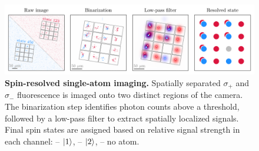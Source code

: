 
\begin{figure}
    \centering
    \includegraphics{fig-py/imaging-spin-resolved.pdf}
    \caption{
        \textbf{Spin-resolved single-atom imaging.}
        Spatially separated $\sigma_+$ and $\sigma_-$ fluorescence is imaged onto two distinct regions of the camera. The binarization step identifies photon counts above a threshold, followed by a low-pass filter to extract spatially localized signals. Final spin states are assigned based on relative signal strength in each channel:
        \raisebox{-1pt}{\scalebox{1.5}{\textcolor{ublue}{\textbullet}}} -- $\left| 1 \right\rangle$, 
        \raisebox{-1pt}{\scalebox{1.5}{\textcolor{ured}{\textbullet}}} -- $\left| 2 \right\rangle$, 
        \raisebox{-1pt}{\scalebox{1.5}{\textcolor{uhole}{\textbullet}}} -- no atom.
    }
    \label{fig:spin-resolved}
\end{figure}




